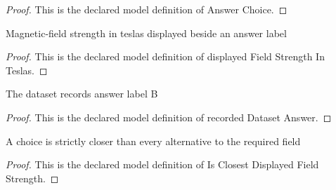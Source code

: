 \begin{proof}
  This is the declared model definition of Answer Choice.
\end{proof}
\begin{definition}
  \label{def:physics:phyx-mini-0972:phyxminiproblems-problemphyxmini0972-answerchoice-displayedfieldstrengthinteslas}
  Magnetic-field strength in teslas displayed beside an answer label
\end{definition}
\begin{proof}
  This is the declared model definition of displayed Field Strength In Teslas.
\end{proof}
\begin{definition}
  \label{def:physics:phyx-mini-0972:phyxminiproblems-problemphyxmini0972-recordeddatasetanswer}
  The dataset records answer label B
\end{definition}
\begin{proof}
  This is the declared model definition of recorded Dataset Answer.
\end{proof}
\begin{definition}
  \label{def:physics:phyx-mini-0972:phyxminiproblems-problemphyxmini0972-isclosestdisplayedfieldstrength}
  A choice is strictly closer than every alternative to the required field
\end{definition}
\begin{proof}
  This is the declared model definition of Is Closest Displayed Field Strength.
\end{proof}
